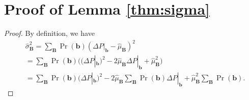 \documentclass[twoside,leqno,twocolumn]{article}
\begin{document}
\section{Proof of Lemma \ref{thm:sigma}}\label{sec:thm:sigma}
\begin{proof}
By definition, we have
\begin{equation*}
\begin{split}
& \hat{\sigma}_{\mathbf{B}}^{2}=\sum_{\mathbf{B}}\Pr(\mathbf{b})(\Delta P|_{\mathbf{b}}-\hat{\mu}_{\mathbf{B}})^{2} \\
& = \sum_{\mathbf{B}}\Pr(\mathbf{b})\Big( (\Delta P|_{\mathbf{b}})^{2} - 2\hat{\mu}_{\mathbf{B}}\Delta P|_{\mathbf{b}} + \hat{\mu}_{\mathbf{B}}^{2} \Big) \\
& = \sum_{\mathbf{B}}\Pr(\mathbf{b})(\Delta P|_{\mathbf{b}})^{2} -2\hat{\mu}_{\mathbf{B}}\sum_{\mathbf{B}}\Pr(\mathbf{b})\Delta P|_{\mathbf{b}}  + \hat{\mu}_{\mathbf{B}}^{2}\sum_{\mathbf{B}}\Pr(\mathbf{b}).
\end{split}
\end{equation*}


\end{proof}
\end{document}
